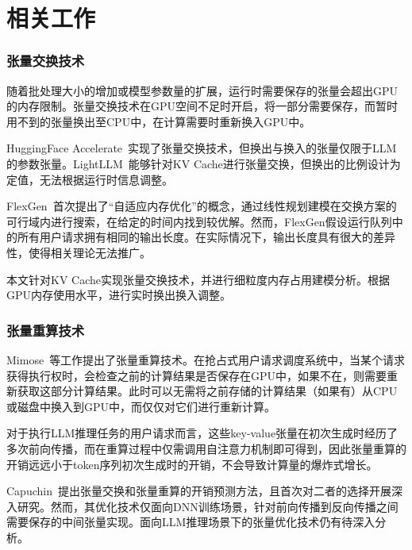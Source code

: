 \section{相关工作}

\subsubsection{张量交换技术}

随着批处理大小的增加或模型参数量的扩展，运行时需要保存的张量会超出GPU的内存限制。张量交换技术在GPU空间不足时开启，将一部分需要保存，而暂时用不到的张量换出至CPU中，在计算需要时重新换入GPU中。

HuggingFace Accelerate~\cite{Huggingface-Accelerate}实现了张量交换技术，但换出与换入的张量仅限于LLM的参数张量。LightLLM~\cite{LightLLM}能够针对KV Cache进行张量交换，但换出的比例设计为定值，无法根据运行时信息调整。

FlexGen~\cite{Swapping}首次提出了“自适应内存优化”的概念，通过线性规划建模在交换方案的可行域内进行搜索，在给定的时间内找到较优解。然而，FlexGen假设运行队列中的所有用户请求拥有相同的输出长度。在实际情况下，输出长度具有很大的差异性，使得相关理论无法推广。

本文针对KV Cache实现张量交换技术，并进行细粒度内存占用建模分析。根据GPU内存使用水平，进行实时换出换入调整。

\subsubsection{张量重算技术}

Mimose~\cite{Recomputation}等工作提出了张量重算技术。在抢占式用户请求调度系统中，当某个请求获得执行权时，会检查之前的计算结果是否保存在GPU中，如果不在，则需要重新获取这部分计算结果。此时可以无需将之前存储的计算结果（如果有）从CPU或磁盘中换入到GPU中，而仅仅对它们进行重新计算。

对于执行LLM推理任务的用户请求而言，这些key-value张量在初次生成时经历了多次前向传播，而在重算过程中仅需调用自注意力机制即可得到，因此张量重算的开销远远小于token序列初次生成时的开销，不会导致计算量的爆炸式增长。

{\color{red}Capuchin~\cite{Capuchin}提出张量交换和张量重算的开销预测方法，且首次对二者的选择开展深入研究。然而，其优化技术仅面向DNN训练场景，针对前向传播到反向传播之间需要保存的中间张量实现。面向LLM推理场景下的张量优化技术仍有待深入分析。}

